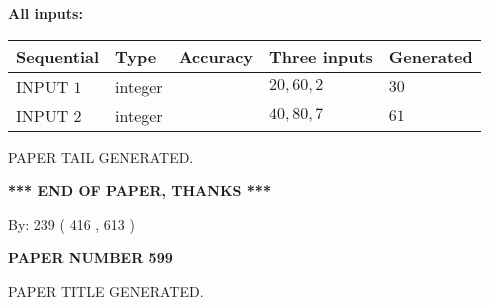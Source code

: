 \documentclass[12pt]{article}
\begin{document}
   
   
   
\noindent\vspace{0.1in}\hspace{-0.08in} {\textbf{\Large{All inputs: }}}
   
   
  
  
\noindent\begin{tabular}{|l|l|l|l|l|}
\hline
 Sequential & Type & Accuracy & Three inputs & Generated \\ 
\hline
 
 
  INPUT $  1 $ & integer &  & $
 20
 , 
 60
 , 
 2
 $ & $ 30 $ 
 \\  \hline  
 
 
  INPUT $  2 $ & integer &  & $
 40
 , 
 80
 , 
 7
 $ & $ 61 $ 
 \\  \hline  
 \end{tabular}
   
   
   
   
   
   
 \vspace{0.2in}
 
   
   
\vspace{2.0in} PAPER TAIL GENERATED.
   
   
   
   
\vspace{1.0in} 
{\textbf{\large{ *** END OF PAPER, THANKS *** }}} 
   
   
\hspace{1.0in} By: 
 239 ( 416 ,  613 )
   
   
   
   
\newpage 
\setcounter{page}{ 
   599001 } 
   
   
   
   
 {\textbf{ \Large{ PAPER NUMBER  599  }}}
   
   
\vspace{0.2in}
   
   
   
   
   
   
   
   
 \vspace{0.2in}
 
 
 
 
   
   
 PAPER TITLE GENERATED.
   
   
   
\vspace{0.2in}
   
\end{document}
